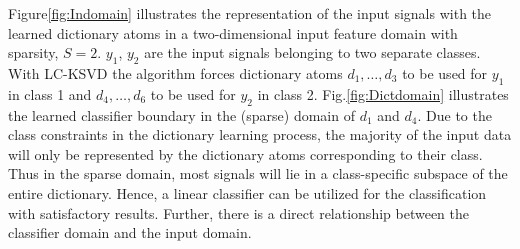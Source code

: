 Figure\ref{fig:Indomain} illustrates the representation of the input signals with the learned dictionary atoms in a two-dimensional input feature domain with sparsity, $S =2$. $y_1$, $y_2$ are the input signals belonging to two separate classes. With LC-KSVD the algorithm forces dictionary atoms $d_1, \dots , d_3$ to be used for $y_1$ in class 1 and $d_4, \dots , d_6$ to be used for $y_2$ in class 2. Fig.\ref{fig:Dictdomain} illustrates the learned classifier boundary in the (sparse) domain of $d_1$ and $d_4$. Due to the class constraints in the dictionary learning process, the majority of the input data will only be represented by the dictionary atoms corresponding to their class. Thus in the sparse domain, most signals will lie in a class-specific subspace of the entire dictionary. Hence, a linear classifier can be utilized for the classification with satisfactory results. Further, there is a direct relationship between the classifier domain and the input domain. 